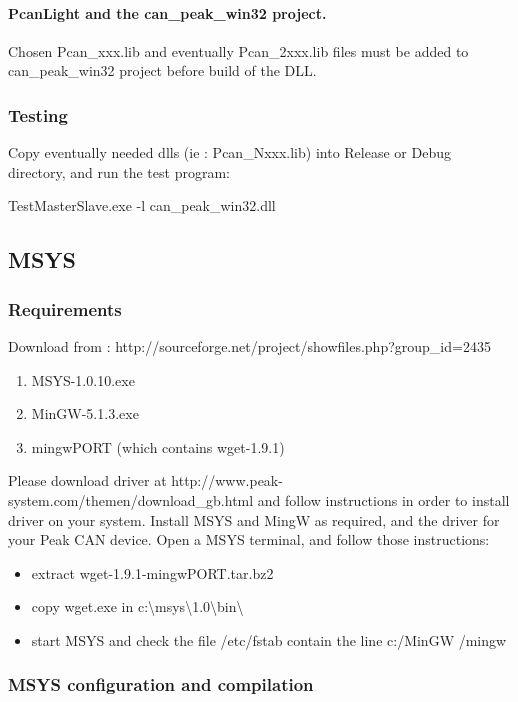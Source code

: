 \documentclass[a4paper,12pt]{book}
\begin{document}
\paragraph{PcanLight and the can\_peak\_win32 project.}
Chosen Pcan\_xxx.lib and eventually Pcan\_2xxx.lib files must be added
to can\_peak\_win32 \space \space project before build of the DLL.

\subsubsection{Testing}
Copy eventually needed dlls (ie : Pcan\_Nxxx.lib) into Release or Debug
directory, and run the test program:

{\ttfamily
TestMasterSlave.exe {}-l can\_peak\_win32.dll}

\subsection{MSYS}


\subsubsection{Requirements}

Download from : http://sourceforge.net/project/showfiles.php?group\_id=2435

\begin{enumerate}
\item MSYS-1.0.10.exe
\item MinGW-5.1.3.exe
\item mingwPORT (which contains wget-1.9.1)
\end{enumerate}
Please download driver at http://www.peak-system.com/themen/download\_gb.html
and follow instructions in order to install driver on your system.
Install MSYS and MingW as required, and the driver for your Peak CAN
device. Open a MSYS terminal, and follow those instructions:\\


\begin{itemize}
\item extract wget-1.9.1-mingwPORT.tar.bz2
\item copy wget.exe in c:\textbackslash{}msys\textbackslash{}1.0\textbackslash{}bin\textbackslash{}
\item start MSYS and check the file /etc/fstab contain the line c:/MinGW
/mingw
\end{itemize}

\subsubsection{MSYS configuration and compilation}
\end{document}
